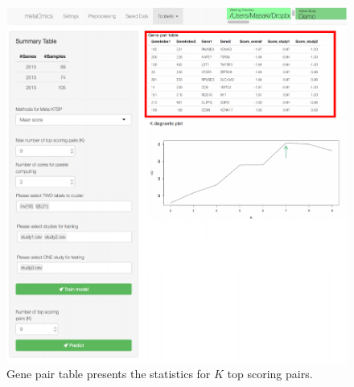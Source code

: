 \begin{figure}[H]
\begin{center}
\includegraphics[scale=0.7]{./figure/MetaKTSP/Figure9.pdf}
\caption{Gene pair table presents the statistics for $K$ top scoring pairs.}
\label{fig:PairTable}
\end{center}
\end{figure}

